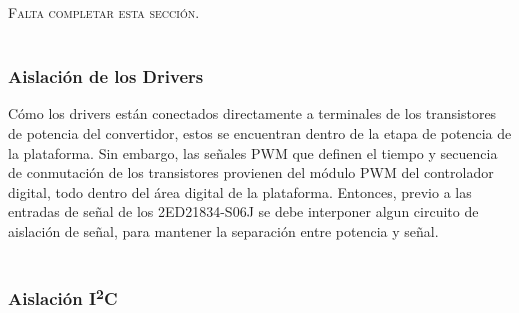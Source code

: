 {\Bold\scshape Falta completar esta sección.}\\

\lipsum[1]\\

\subsubsection{Aislación de los Drivers}

Cómo los drivers están conectados directamente a terminales de los transistores de potencia del convertidor, estos se encuentran dentro de la etapa de potencia de la plataforma. Sin embargo, las señales PWM que definen el tiempo y secuencia de conmutación de los transistores provienen del módulo PWM del controlador digital, todo dentro del área digital de la plataforma. Entonces, previo a las entradas de señal de los 2ED21834-S06J se debe interponer algun circuito de aislación de señal, para mantener la separación entre potencia y señal.\\

\lipsum[2]\\

\subsubsection{Aislación I\textsuperscript{2}C}

\lipsum[2]\\

